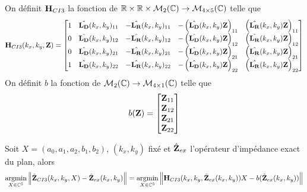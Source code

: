    \begin{defn}
      On définit \(\mathbf{H}_{CI3}\) la fonction de \(\mathbb R \times \mathbb R \times \mathcal{M}_2(\mathbb C) \rightarrow \mathcal{M}_{4\times5}(\mathbb C)\) telle que
      \begin{equation*}
        \mathbf{H}_{CI3}(k_x,k_y,\mathbf{Z}) = \begin{bmatrix}
        1 & \hat{\mathbf{L_D}}(k_x,k_y)_{11} & -\hat{\mathbf{L_R}}(k_x,k_y)_{11} & -\left(\hat{\mathbf{L_D}}(k_x,k_y)\mathbf{Z}\right)_{11} & \left(\hat{\mathbf{L_R}}(k_x,k_y)\mathbf{Z}\right)_{11}
        \\
        0 & \hat{\mathbf{L_D}}(k_x,k_y)_{12} & -\hat{\mathbf{L_R}}(k_x,k_y)_{12} & -\left(\hat{\mathbf{L_D}}(k_x,k_y)\mathbf{Z}\right)_{12} & \left(\hat{\mathbf{L_R}}(k_x,k_y)\mathbf{Z}\right)_{12}
        \\
        0 & \hat{\mathbf{L_D}}(k_x,k_y)_{21} & -\hat{\mathbf{L_R}}(k_x,k_y)_{21} & -\left(\hat{\mathbf{L_D}}(k_x,k_y)\mathbf{Z}\right)_{21} & \left(\hat{\mathbf{L_R}}(k_x,k_y)\mathbf{Z}\right)_{21}
        \\
        1 & \hat{\mathbf{L_D}}(k_x,k_y)_{22} & -\hat{\mathbf{L_R}}(k_x,k_y)_{22} & -\left(\hat{\mathbf{L_D}}(k_x,k_y)\mathbf{Z}\right)_{22} & \left(\hat{\mathbf{L_R}}(k_x,k_y)\mathbf{Z}\right)_{22}
        \end{bmatrix}
      \end{equation*}
      On définit \(b\) la fonction de \(\mathcal{M}_2(\mathbb C) \rightarrow \mathcal{M}_{4\times1}(\mathbb C)\) telle que
      \begin{equation*}
        b(\mathbf{Z}) = \begin{bmatrix}
        \mathbf{Z}_{11}
        \\
        \mathbf{Z}_{12}
        \\
        \mathbf{Z}_{21}
        \\
        \mathbf{Z}_{22}
        \end{bmatrix}
      \end{equation*}
    \end{defn}

    \begin{prop}
      Soit \(X = (a_0,a_1,a_2,b_1,b_2)\), \((k_x,k_y)\) fixé et \(\hat{\mathbf{Z}}_{ex}\) l'opérateur d'impédance exact du plan, alors
      \begin{equation*}
        {\underset{X\in\mathbb C^5}{\operatorname{argmin}}} \left\lVert\hat{\mathbf{Z}}_{CI3}(k_x,k_y,X) - \hat{\mathbf{Z}}_{ex}(k_x,k_y)\right\rVert = {\underset{X\in\mathbb C^5}{\operatorname{argmin}}} \left\lVert\mathbf{H}_{CI3}(k_x,k_y,\hat{\mathbf{Z}}_{ex}(k_x,k_y))X - b(\hat{\mathbf{Z}}_{ex}(k_x,k_y))\right\rVert
      \end{equation*}
    \end{prop}

